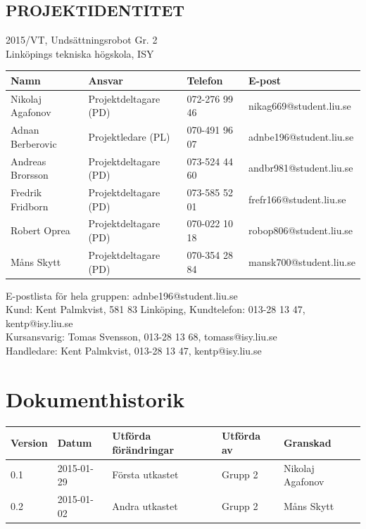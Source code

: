 \documentclass[11pt]{article}
\begin{document}
\pagebreak
\begin{center}

\section*{PROJEKTIDENTITET}
2015/VT, Undsättningsrobot Gr. 2
\\
Linköpings tekniska högskola, ISY
\\[0.5in]
\begin{table}[h]
\begin{tabular}{|l|l|l|l|} \hline
Namn & Ansvar & Telefon & E-post \\[0.1in] \hline
Nikolaj Agafonov & Projektdeltagare (PD) & 072-276 99 46 & nikag669@student.liu.se \\ \hline
Adnan Berberovic & Projektledare (PL) & 070-491 96 07 & adnbe196@student.liu.se \\ \hline
Andreas Brorsson & Projektdeltagare (PD) & 073-524 44 60 & andbr981@student.liu.se \\ \hline
Fredrik Fridborn & Projektdeltagare (PD) & 073-585 52 01 & frefr166@student.liu.se \\ \hline
Robert Oprea & Projektdeltagare (PD) & 070-022 10 18 & robop806@student.liu.se \\ \hline
Måns Skytt & Projektdeltagare (PD) & 070-354 28 84 & mansk700@student.liu.se \\ \hline
\end{tabular}
\end{table}

E-postlista för hela gruppen: adnbe196@student.liu.se
\\[1in]
Kund: Kent Palmkvist, 581 83 Linköping,
Kundtelefon: 013-28 13 47, kentp@isy.liu.se
\\[1in]
Kursansvarig: Tomas Svensson, 013-28 13 68, tomass@isy.liu.se
\\
Handledare: Kent Palmkvist, 013-28 13 47, kentp@isy.liu.se
\end{center}
\pagebreak

\tableofcontents

\pagebreak

\section*{Dokumenthistorik}
\begin{table}[h]
\begin{tabular}{|l|l|l|l|l|} \hline

Version & 
Datum & 
Utförda förändringar & 
Utförda av & 
Granskad \\[0.1in] \hline
0.1 &
2015-01-29 & 
Första utkastet & 
Grupp 2 & 
Nikolaj Agafonov \\ \hline
0.2 &
2015-01-02 &
Andra utkastet &
Grupp 2 &
Måns Skytt \\ \hline
\end{tabular}
\end{table}
\end{document}
